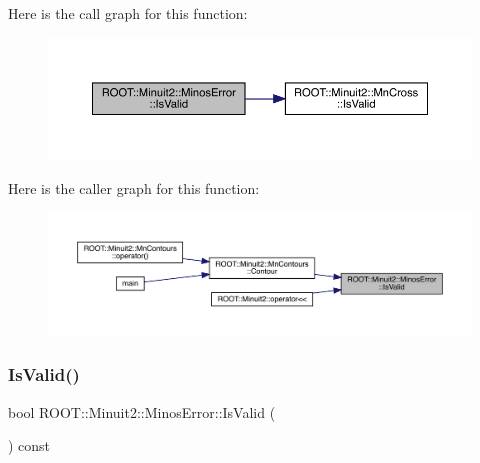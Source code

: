 Here is the call graph for this function\+:
\nopagebreak
\begin{figure}[H]
\begin{center}
\leavevmode
\includegraphics[width=350pt]{d2/dd1/classROOT_1_1Minuit2_1_1MinosError_af6b7accfe397a06417ecc1f989d82e00_cgraph}
\end{center}
\end{figure}
Here is the caller graph for this function\+:
\nopagebreak
\begin{figure}[H]
\begin{center}
\leavevmode
\includegraphics[width=350pt]{d2/dd1/classROOT_1_1Minuit2_1_1MinosError_af6b7accfe397a06417ecc1f989d82e00_icgraph}
\end{center}
\end{figure}
\mbox{\label{classROOT_1_1Minuit2_1_1MinosError_af6b7accfe397a06417ecc1f989d82e00}} 
\subsubsection{\texorpdfstring{IsValid()}{IsValid()}\hspace{0.1cm}{\footnotesize\ttfamily [2/3]}}
{\footnotesize\ttfamily bool R\+O\+O\+T\+::\+Minuit2\+::\+Minos\+Error\+::\+Is\+Valid (\begin{DoxyParamCaption}{ }\end{DoxyParamCaption}) const\hspace{0.3cm}{\ttfamily [inline]}}

